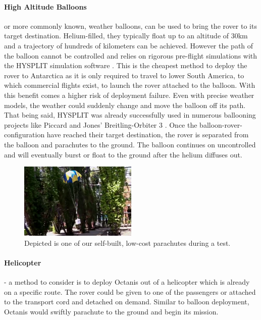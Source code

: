 \documentclass[a4paper,12pt]{article}
\begin{document}
\paragraph{High Altitude Balloons} or more commonly known, weather balloons, can be used to bring the rover to its target destination. Helium-filled, they typically float up to an altitude of 30km and a trajectory of hundreds of kilometers can be achieved. However the path of the balloon cannot be controlled and relies on rigorous pre-flight simulations with the HYSPLIT simulation software \cite{hysplit} \cite{hysplitjava}. This is the cheapest method to deploy the rover to Antarctica as it is only required to travel to lower South America, to which commercial flights exist, to launch the rover attached to the balloon. With this benefit comes a higher risk of deployment failure. Even with precise weather models, the weather could suddenly change and move the balloon off its path. That being said, HYSPLIT was already successfully used in numerous ballooning projects like Piccard and Jones' Breitling-Orbiter 3 \cite{hysplitexamples}.
Once the balloon-rover-configuration have reached their target destination, the rover is separated from the balloon and parachutes to the ground. The balloon continues on uncontrolled and will eventually burst or float to the ground after the helium diffuses out.

\begin{figure}[h!]
	\centering
    \includegraphics[width=0.5\textwidth]{lowcostchute}
    \caption{Depicted is one of our self-built, low-cost parachutes during a test. }
\end{figure}


\paragraph{Helicopter} - a method to consider is to deploy Octanis out of a helicopter which is already on a specific route. The rover could be given to one of the passengers or attached to the transport cord and detached on demand. Similar to balloon deployment, Octanis would swiftly parachute to the ground and begin its mission.
\end{document}
